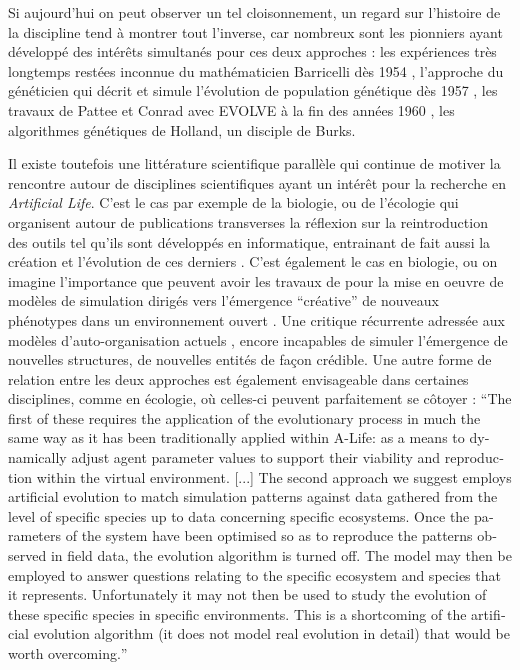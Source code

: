 Si aujourd'hui on peut observer un tel cloisonnement, un regard sur l'histoire de la discipline tend à montrer tout l'inverse, car nombreux sont les pionniers ayant développé des intérêts simultanés pour ces deux approches : les expériences très longtemps restées inconnue du mathématicien Barricelli dès 1954 , l'approche du généticien \textcite{Fraser1957} qui décrit et simule l'évolution de population génétique dès 1957 , les travaux de Pattee et Conrad avec EVOLVE à la fin des années 1960 \autocite{Conrad1970}, les algorithmes génétiques  de Holland, un disciple de Burks.

Il existe toutefois une littérature scientifique parallèle qui continue de motiver la rencontre autour de disciplines scientifiques ayant un intérêt pour la recherche en \textit{Artificial Life}. C'est le cas par exemple de la biologie, ou de l'écologie \autocite{Hamblin2013} qui organisent autour de publications transverses la réflexion sur la reintroduction des outils tel qu'ils sont développés en informatique, entrainant de fait aussi la création et l'évolution de ces derniers \autocite{Hogeweg2011}. C'est également le cas en biologie, ou on imagine l'importance que peuvent avoir les travaux de \textcites{Taylor2001}[221]{Taylor1999} pour la mise en oeuvre de modèles de simulation dirigés vers l'émergence \enquote{créative} de nouveaux phénotypes dans un environnement ouvert \autocite[33]{Taylor1999}. Une critique récurrente adressée aux modèles d'auto-organisation actuels \autocite{Pumain2003}, encore incapables de simuler l'émergence de nouvelles structures, de nouvelles entités de façon crédible. Une autre forme de relation entre les deux approches est également envisageable dans certaines disciplines, comme en écologie, où celles-ci peuvent parfaitement se côtoyer : \foreignquote{english}{The first of these requires the application of the evolutionary process in much the same way as it has been traditionally applied within A-Life: as a means to dynamically adjust agent parameter values to support their viability and reproduction within the virtual environment. [...] The second approach we suggest employs artificial evolution to match simulation patterns against data gathered from the level of specific species up to data concerning specific ecosystems. Once the parameters of the system have been optimised so as to reproduce the patterns observed in field data, the evolution algorithm is turned off. The model may then be employed to answer questions relating to the specific ecosystem and species that it represents. Unfortunately it may not then be used to study the evolution of these specific species in specific environments. This is a shortcoming of the artificial evolution algorithm (it does not model real evolution in detail) that would be worth overcoming.} \autocite{Dorin2008}


